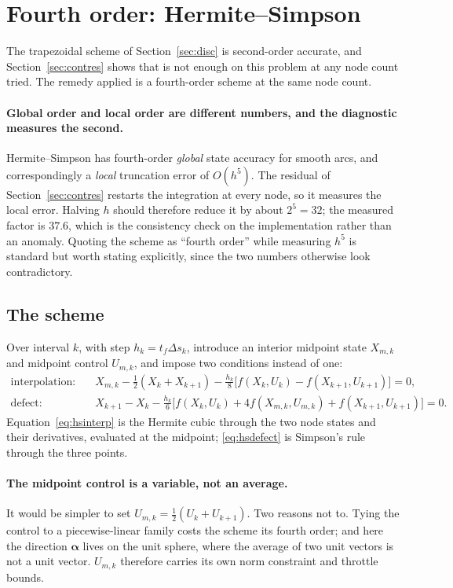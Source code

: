 \documentclass[11pt]{article}
\newcommand{\bal}{\boldsymbol{\alpha}}
\begin{document}
\section{Fourth order: Hermite--Simpson}
\label{sec:hs}

The trapezoidal scheme of Section~\ref{sec:disc} is second-order accurate, and
Section~\ref{sec:contres} shows that is not enough on this problem at any node
count tried. The remedy applied is a fourth-order scheme at the same node count.

\paragraph{Global order and local order are different numbers, and the
diagnostic measures the second.} Hermite--Simpson has fourth-order \emph{global}
state accuracy for smooth arcs, and correspondingly a \emph{local} truncation
error of $O(h^5)$. The residual of Section~\ref{sec:contres} restarts the
integration at every node, so it measures the local error. Halving $h$ should
therefore reduce it by about $2^5 = 32$; the measured factor is $37.6$, which is
the consistency check on the implementation rather than an anomaly. Quoting the
scheme as ``fourth order'' while measuring $h^5$ is standard but worth stating
explicitly, since the two numbers otherwise look contradictory.

\subsection{The scheme}

Over interval $k$, with step $h_k = t_f \Delta s_k$, introduce an interior
midpoint state $X_{m,k}$ and midpoint control $U_{m,k}$, and impose two
conditions instead of one:
\begin{align}
  \text{interpolation:}\quad & X_{m,k} - \tfrac{1}{2}(X_k + X_{k+1})
      - \tfrac{h_k}{8}\bigl[f(X_k,U_k) - f(X_{k+1},U_{k+1})\bigr] = 0,
      \label{eq:hsinterp}\\
  \text{defect:}\quad & X_{k+1} - X_k
      - \tfrac{h_k}{6}\bigl[f(X_k,U_k) + 4 f(X_{m,k},U_{m,k})
      + f(X_{k+1},U_{k+1})\bigr] = 0. \label{eq:hsdefect}
\end{align}
Equation~\eqref{eq:hsinterp} is the Hermite cubic through the two node states
and their derivatives, evaluated at the midpoint; \eqref{eq:hsdefect} is
Simpson's rule through the three points.

\paragraph{The midpoint control is a variable, not an average.} It would be
simpler to set $U_{m,k} = \tfrac{1}{2}(U_k + U_{k+1})$. Two reasons not to.
Tying the control to a piecewise-linear family costs the scheme its fourth
order; and here the direction $\bal$ lives on the unit sphere, where the average
of two unit vectors is not a unit vector. $U_{m,k}$ therefore carries its own
norm constraint and throttle bounds.
\end{document}
